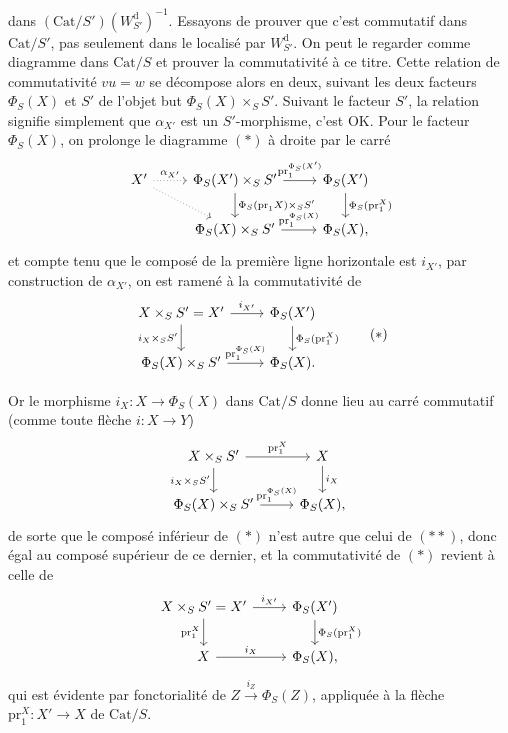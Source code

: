 \documentclass[11pt]{article}
\newcommand{\printedpage}[1]{\marginpar{\footnotesize p.~#1}}
\newcommand{\msp}[1]{\marginpar{\footnotesize [#1]}}
\newcommand{\Cat}{\mathrm{Cat}}
\newcommand{\pr}{\mathrm{pr}}
\newcommand{\dd}{\mathrm{d}}
\begin{document}
\printedpage{89}

dans $(\Cat/S')(W^{\dd}_{S'})^{-1}$. Essayons de prouver que c'est commutatif dans $\Cat/S'$, pas seulement dans le localisé par $W^{\dd}_{S'}$. On peut le regarder comme diagramme dans $\Cat/S$ et prouver la commutativité à ce titre. Cette relation de commutativité $vu = w$ se décompose alors en deux, suivant les deux facteurs $\Phi_S(X)$ et $S'$ de l'objet but $\Phi_S(X) \times_S S'$. Suivant le facteur $S'$, la relation signifie simplement que $\alpha_{X'}$ est un $S'$-morphisme, c'est OK. Pour le facteur $\Phi_S(X)$, on prolonge le diagramme $(*)$ à droite par le carré
\[
\begin{tikzcd}
X' \arrow[r, dotted, "\alpha_{X'}"] \arrow[dr, dotted] & \Phi_S(X') \times_S S' \arrow[r, "\pr_1^{\Phi_S(X')}"] \arrow[d, "\Phi_S(\pr_1 X)\times_S S'"] & \Phi_S(X') \arrow[d, "\Phi_S(\pr_1^X)"] \\
 & \Phi_S(X) \times_S S' \arrow[r, "\pr_1^{\Phi_S(X)}"] & \Phi_S(X),
\end{tikzcd}
\] %
\msp{page 146}
et compte tenu que le composé de la première ligne horizontale est $i_{X'}$, par construction de $\alpha_{X'}$, on est ramené à la commutativité de
\[
\begin{tikzcd}
X \times_S S' = X' \arrow[r, "i_{X'}"] \arrow[d, "i_X\times_S S'"'] & \Phi_S(X') \arrow[d, "\Phi_S(\pr_1^X)"] \\
\Phi_S(X) \times_S S' \arrow[r, "\pr_1^{\Phi_S(X)}"] & \Phi_S(X).
\end{tikzcd}
\tag*{$(*)$}
\]

Or le morphisme $i_X : X \longrightarrow \Phi_S(X)$ dans $\Cat/S$ donne lieu au carré commutatif (comme toute flèche $i : X \longrightarrow Y$)
\[
\begin{tikzcd}
X \times_S S' \arrow[r, "\pr_1^X"] \arrow[d, "i_X\times_S S'"'] & X \arrow[d, "i_X"] \\
\Phi_S(X) \times_S S' \arrow[r, "\pr_1^{\Phi_S(X)}"] & \Phi_S(X),
\end{tikzcd}
\]
de sorte que le composé inférieur de $(*)$ n'est autre que celui de $(**)$, donc égal au composé supérieur de ce dernier, et la commutativité de $(*)$ revient à celle de
\[
\begin{tikzcd}
X \times_S S' = X' \arrow[r, "i_{X'}"] \arrow[d, "\pr_1^X"'] & \Phi_S(X') \arrow[d, "\Phi_S(\pr_1^X)"] \\
X \arrow[r, "i_X"] & \Phi_S(X),
\end{tikzcd}
\]
qui est évidente par fonctorialité de $Z \xrightarrow{i_Z} \Phi_S(Z)$, appliquée à la flèche $\pr_1^X : X' \longrightarrow X$ de $\Cat/S$.
\end{document}
